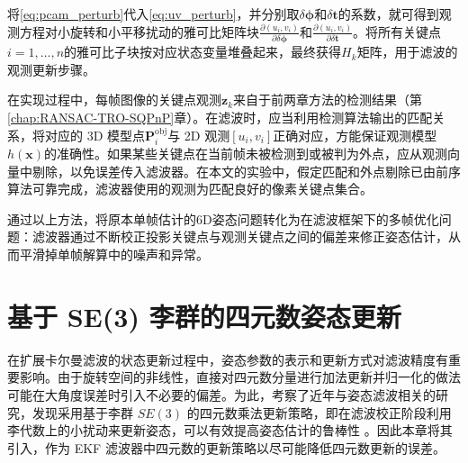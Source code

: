 将\eqref{eq:pcam_perturb}代入\eqref{eq:uv_perturb}，并分别取$\delta \boldsymbol{\phi}$和$\delta \mathbf{t}$的系数，就可得到观测方程对小旋转和小平移扰动的雅可比矩阵块$\frac{\partial (u_i,v_i)}{\partial \delta \boldsymbol{\phi}}$和$\frac{\partial (u_i,v_i)}{\partial \delta \mathbf{t}}$。将所有关键点$i=1,\dots,n$的雅可比子块按对应状态变量堆叠起来，最终获得$H_k$矩阵，用于滤波的观测更新步骤。

在实现过程中，每帧图像的关键点观测$\mathbf{z}_k$来自于前两章方法的检测结果（第\ref{chap:RANSAC-TRO-SQPnP}章）。在滤波时，应当利用检测算法输出的匹配关系，将对应的 3D 模型点$\mathbf{P}_i^{\mathrm{obj}}$与 2D 观测$[u_i, v_i]$正确对应，方能保证观测模型$h(\mathbf{x})$的准确性。如果某些关键点在当前帧未被检测到或被判为外点，应从观测向量中剔除，以免误差传入滤波器。在本文的实验中，假定匹配和外点剔除已由前序算法可靠完成，滤波器使用的观测为匹配良好的像素关键点集合。

通过以上方法，将原本单帧估计的6D姿态问题转化为在滤波框架下的多帧优化问题：滤波器通过不断校正投影关键点与观测关键点之间的偏差来修正姿态估计，从而平滑掉单帧解算中的噪声和异常。


\section{基于 SE(3) 李群的四元数姿态更新}

在扩展卡尔曼滤波的状态更新过程中，姿态参数的表示和更新方式对滤波精度有重要影响。由于旋转空间的非线性，直接对四元数分量进行加法更新并归一化的做法可能在大角度误差时引入不必要的偏差。为此，考察了近年与姿态滤波相关的研究，发现采用基于李群 $SE(3)$ 的四元数乘法更新策略，即在滤波校正阶段利用李代数上的小扰动来更新姿态，可以有效提高姿态估计的鲁棒性 \cite{9780112,Fang2024Kinematic}。因此本章将其引入，作为 EKF 滤波器中四元数的更新策略以尽可能降低四元数更新的误差。

